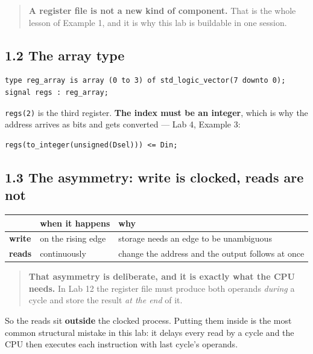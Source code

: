 \documentclass[11pt]{article}
\newcommand{\code}[1]{\texttt{#1}}
\begin{document}
\begin{quote}
\textbf{A register file is not a new kind of component.} That is the whole
lesson of Example 1, and it is why this lab is buildable in one session.
\end{quote}

\subsection*{1.2 The array type}

\begin{lstlisting}
type reg_array is array (0 to 3) of std_logic_vector(7 downto 0);
signal regs : reg_array;
\end{lstlisting}

\code{regs(2)} is the third register. \textbf{The index must be an integer}, which
is why the address arrives as bits and gets converted --- Lab 4, Example 3:

\begin{lstlisting}
regs(to_integer(unsigned(Dsel))) <= Din;
\end{lstlisting}

\subsection*{1.3 The asymmetry: write is clocked, reads are not}

\begin{center}
\begin{tabular}{lll}
\toprule
& when it happens & why \\
\midrule
\textbf{write} & on the rising edge & storage needs an edge to be unambiguous \\
\textbf{reads} & continuously & change the address and the output follows at once \\
\bottomrule
\end{tabular}
\end{center}

\begin{quote}
\textbf{That asymmetry is deliberate, and it is exactly what the CPU needs.} In
Lab 12 the register file must produce both operands \emph{during} a cycle and
store the result \emph{at the end} of it.
\end{quote}

So the reads sit \textbf{outside} the clocked process. Putting them inside is the
most common structural mistake in this lab: it delays every read by a cycle and
the CPU then executes each instruction with last cycle's operands.
\end{document}
